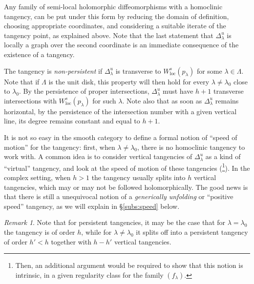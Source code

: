 \documentclass[11pt, oneside]{amsart}
\newcommand{\lo}{{\lambda_0}}
\newcommand{\loc}{{\mathrm{loc}}}
\theoremstyle{remark}
\newtheorem{rmk}[prop]{Remark}
\theoremstyle{definition}
\theoremstyle{theorem}
\begin{document}
Any family of semi-local holomorphic diffeomorphisms with a homoclinic tangency, 
can be put under this  form by reducing the 
domain of definition, choosing appropriate coordinates, 
and considering a suitable iterate of the tangency point, as explained above.  
Note that the last statement that $\Delta^u_\lambda$
 is locally a graph over the second coordinate 
is an immediate consequence of the existence of a tangency.

The tangency is \emph{non-persistent} if
$\Delta^u_\lambda$ is transverse  to $W^s_\loc(p_\lambda)$ for some $\lambda\in \Lambda$. 
Note that if $\Lambda$ is the unit disk, this property will then hold for every $\lambda\neq\lambda_0$   
close to $\lambda_0$. By the persistence of 
proper intersections, $\Delta^u_\lambda$ must have $h+1$  transverse intersections with  $W^s_\loc(p_\lambda)$ for  such  $\lambda$.   
 Note also that as soon as $\Delta^u_\lambda$ remains horizontal, by the persistence of the intersection number with a given vertical line,  its degree remains constant and equal to $h+1$.

It is not so easy in the smooth category 
to define a formal notion 
of ``speed of motion'' for the tangency: first, when $\lambda\neq\lambda_0$, there is no homoclinic
 tangency to work with. 
A common idea is to consider   vertical tangencies of $\Delta^u_\lambda$ as a kind  of 
 ``virtual'' tangency, and look at the speed of motion of these tangencies (\footnote{Then, an additional argument would be required to show that this notion is intrinsic, in a given regularity 
 class for  the family $(f_\lambda)$.}).
In the complex setting, when $h>1$ the tangency usually splits into $h$ vertical 
tangencies, which  may or may not be followed holomorphically. The good news is that there is 
still a unequivocal notion of a \emph{generically unfolding} or ``positive speed'' tangency, 
as we will explain in \S\ref{subs:speed} below.  

\begin{rmk}\label{rmk:semi-continuity-persistent}
Note that for persistent tangencies,  it may be the case 
that for $\lambda=\lo$ the tangency is of order $h$, while for $\lambda\neq \lo$ 
it splits off into a persistent tangency of order $h'<h$ together with $h - h'$ vertical tangencies.
\end{rmk}
\end{document}
